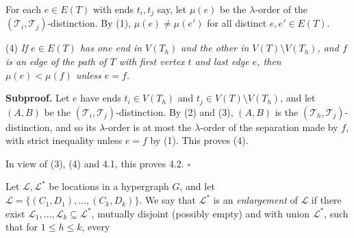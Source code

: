 For each $e \in E(T)$ with ends $t_i, t_j$ say, let $\mu(e)$ be the $\lambda$-order of the $(\mathscr{T}_i, \mathscr{T}_j)$-distinction. By (1), $\mu(e) \ne \mu(e')$ for all distinct $e, e' \in E(T)$.

\hspace*{12pt}(4) \textit{If $e \in E(T)$ has one end in $V(T_h)$ and the other in $V(T) \setminus V(T_h)$, and $f$ is an edge of the path of $T$ with first vertex $t$ and last edge $e$, then $\mu(e) < \mu(f)$ unless $e = f$.}

\textbf{Subproof.} Let $e$ have ends $t_i \in V(T_h)$ and $t_j \in V(T) \setminus V(T_h)$, and let $(A, B)$ be the $(\mathscr{T}_i, \mathscr{T}_j)$-distinction. By (2) and (3), $(A, B)$ is the $(\mathscr{T}_h, \mathscr{T}_j)$-distinction, and so its $\lambda$-order is at most the $\lambda$-order of the separation made by $f$, with strict inequality unless $e = f$ by (1). This proves (4).

In view of (3), (4) and 4.1, this proves 4.2. $\square$

Let $\mathscr{L}, \mathscr{L}^*$ be locations in a hypergraph $G$, and let $\mathscr{L} = \{(C_1, D_1), \dots, (C_k, D_k)\}$. We say that $\mathscr{L}^*$ is an \textit{enlargement} of $\mathscr{L}$ if there exist $\mathscr{L}_1, \dots, \mathscr{L}_k \subseteq \mathscr{L}^*$, mutually disjoint (possibly empty) and with union $\mathscr{L}^*$, such that for $1 \le h \le k$, every
